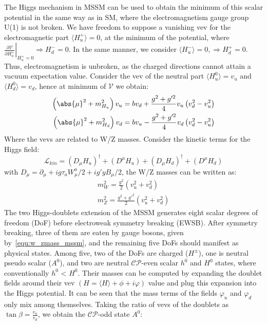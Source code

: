 The Higgs mechanism in MSSM can be used to obtain the minimum of this scalar potential in the same way as in SM, where the electromagnetism gauge group U(1) is not broken. We have freedom to suppose a vanishing vev for the electromagnetic part $\big \langle H_{u}^{+} \big \rangle = 0$, at the minimum of the potential, where $\left.\frac{\partial \mathcal{V}}{\partial H^{+}_{u}}\right|_{H_{u}^{+}=0} \Rightarrow H_{d}^{-} = 0$. In the same manner, we consider $\big \langle H_{u}^{-} \big \rangle = 0, \Rightarrow H_{d}^{+} = 0$. Thus, electromagnetism is unbroken, as the charged directions cannot attain a vacuum expectation value. Consider the vev of the neutral part $\big \langle H_{u}^{0} \big \rangle = v_{u}$ and $\big \langle H_{d}^{0} \big \rangle = v_{d}$, hence at minimum of $\mathcal{V}$ we obtain:
\begin{equation}
\begin{split}
\left(\abs{\mu}^{2} + m^{2}_{H_{u}}\right)v_{u} = bv_{d} + \frac{g^{2}+g'^{2}}{4}v_{u}\left(v_{d}^{2} - v_{u}^{2}\right)\\
\left(\abs{\mu}^{2} + m^{2}_{H_{d}}\right)v_{d} = bv_{u} - \frac{g^{2}+g'^{2}}{4}v_{d}\left(v_{d}^{2} - v_{u}^{2}\right)\\
\end{split}
\end{equation}
Where the vevs are related to W/Z masses. Consider the kinetic terms for the Higgs field:
\begin{equation}
\mathcal{L}_{kin} = \left(D_{\mu}H_{u}\right)^{\dagger} + \left(D^{\mu}H_{u}\right) + \left(D_{\mu}H_{d}\right)^{\dagger} + \left(D^{\mu}H_{d}\right)
\end{equation}
with $D_{\mu} = \partial_{\mu} + ig\tau_{a}W_{\mu}^{a}/2 + ig'yB_{\mu}/2$, the W/Z masses can be written as:
\begin{equation}
\begin{split}
m_{W}^{2} = \frac{g^{2}}{2}\left(v_{u}^{2} + v_{d}^{2}\right)\\
m_{Z}^{2} = \frac{g^{2}+g'^{2}}{2}\left(v_{u}^{2} + v_{d}^{2}\right)
\end{split}\label{equ:w_zmass_mssm}
\end{equation}
The two Higgs-doublets extension of the MSSM generates eight scalar degrees of freedom (DoF) before electroweak symmetry breaking (EWSB). After symmetry breaking, three of them are eaten by gauge bosons, given by~\ref{equ:w_zmass_mssm}, and the remaining five DoFs should manifest as physical states. Among five, two of the DoFs are charged ($H^{\pm}$), one is neutral pseudo scalar ($A^{0}$), and two are neutral $\mathcal{CP}$-even scalar $h^{0}$ and $H^{0}$ states, where conventionally $h^{0}$ < $H^{0}$. Their masses can be computed by expanding the doublet fields around their vev $\left( H = \langle H \rangle + \phi + i\varphi \right)$ value and plug this expansion into the Higgs potential. It can be seen that the mass terms of the fields $\varphi_{u}$ and $\varphi_{d}$ only mix among themselves. Taking the ratio of vevs of the doublets as $\tan\beta = \frac{v_{u}}{v_{d}}$, we obtain the $\mathcal{CP}$-odd state $A^{0}$:
